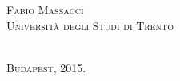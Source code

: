 \begin{titlepage}
\begin{center}
\begin{minipage}{0.62\textwidth}
\begin{flushright}
					\textsc{Fabio \textsc{Massacci} \\Università degli Studi di Trento\\[0.4cm] } %
				\end{flushright}
			\end{minipage}\\[3cm]
			
		\textsc{{\large Budapest, 2015.}}\\[4cm] 
		
		\vfill
	\end{center}
	
\end{titlepage}


